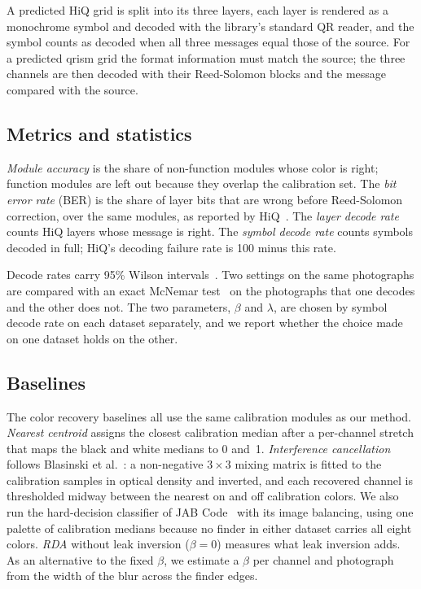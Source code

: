 A predicted HiQ grid is split into its three layers, each layer is rendered as a
monochrome symbol and decoded with the library's standard QR reader, and the symbol counts
as decoded when all three messages equal those of the source. For a predicted qrism grid
the format information must match the source; the three channels are then decoded with
their Reed-Solomon blocks and the message compared with the source.

\subsection{Metrics and statistics}

\emph{Module accuracy} is the share of non-function modules whose color is right; function
modules are left out because they overlap the calibration set. The \emph{bit error rate}
(BER) is the share of layer bits that are wrong before Reed-Solomon correction, over the
same modules, as reported by HiQ~\cite{yang2018hiq}. The \emph{layer decode rate} counts
HiQ layers whose message is right. The \emph{symbol decode rate} counts symbols decoded in
full; HiQ's decoding failure rate is 100 minus this rate.

Decode rates carry 95\% Wilson intervals~\cite{wilson1927}. Two settings on the same
photographs are compared with an exact McNemar test~\cite{mcnemar1947} on the photographs
that one decodes and the other does not. The two parameters, $\beta$ and $\lambda$, are
chosen by symbol decode rate on each dataset separately, and we report whether the choice
made on one dataset holds on the other.

\subsection{Baselines}

The color recovery baselines all use the same calibration modules as our method.
\emph{Nearest centroid} assigns the closest calibration median after a per-channel stretch
that maps the black and white medians to 0 and~1. \emph{Interference cancellation} follows
Blasinski et al.~\cite{blasinski2013pccc}: a non-negative $3\times 3$ mixing matrix is
fitted to the calibration samples in optical density and inverted, and each recovered
channel is thresholded midway between the nearest on and off calibration colors. We also run
the hard-decision classifier of JAB Code~\cite{iso23634} with its image balancing, using one
palette of calibration medians because no finder in either dataset carries all eight colors. \emph{RDA} without leak inversion ($\beta=0$) measures what leak inversion
adds. As an alternative to the fixed $\beta$, we estimate a $\beta$ per channel and
photograph from the width of the blur across the finder edges.

